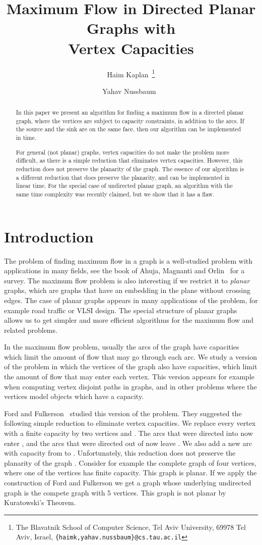 \documentclass[a4paper,11pt]{article}
\title{Maximum Flow in Directed Planar Graphs with\\Vertex Capacities}
\author{Haim Kaplan~\thanks{The Blavatnik School of Computer Science, 
Tel Aviv University, 69978 Tel Aviv, Israel, 
{\small \texttt{\{haimk,yahav.nussbaum\}@cs.tau.ac.il}}}\and Yahav Nussbaum~}
\date{}
\begin{document}
\maketitle

\begin{abstract}
    In this paper we present an   algorithm for  finding
    a maximum flow in a directed planar graph, where the vertices are subject to capacity constraints, in addition to the arcs.
    If the source and the sink are on the same face,
    then our algorithm can be implemented in   time.

    For general (not planar) graphs, vertex capacities do not make the problem more difficult,
    as there is a simple reduction that eliminates vertex capacities.
    However, this reduction does not preserve the planarity of the graph.
    The essence of our algorithm is a different reduction that does preserve the planarity,
      and can be implemented in linear time.
     For the special case of undirected planar graph,
      an algorithm with the same time complexity was recently claimed, but we show that it has a flaw.
\end{abstract}

\section{Introduction}

The problem of finding maximum flow in a graph  is a well-studied
problem with applications in many fields, see the book of Ahuja,
Magnanti and Orlin~\cite{AMO93} for a survey. The maximum flow
problem is also interesting if we restrict it to \emph{planar}
graphs, which are graphs that have an embedding in the plane without
crossing edges. The case of planar graphs appears in many
applications of the problem, for example road traffic or VLSI
design. The special structure of planar graphs allows us to get simpler
and more efficient algorithms for the maximum flow and related problems.

In the maximum flow problem, usually the arcs  of the graph have
capacities which limit the amount of flow that may go through each
arc. We study a version of the problem in which the vertices of the
graph also have capacities, which limit the amount of flow that may
enter each vertex. This version appears for example when
computing vertex disjoint paths in graphs, and  in other problems
where the vertices model objects which have a capacity.

Ford and Fulkerson~\cite[Chapter I.11]{FF62} studied this version of
the problem. They suggested the following simple reduction to
eliminate vertex capacities. We replace every vertex  with a
finite capacity  by two vertices  and . The arcs that were
directed into  now enter , and the arcs that were directed out of
 now leave . We also add a new arc with capacity  from
 to . Unfortunately, this reduction does not preserve the
planarity of the graph \cite{KN94}. Consider for example the
complete graph of four vertices, where one of the vertices has
finite capacity. This graph is planar. If we apply the construction
of Ford and Fulkerson we get a graph whose underlying undirected graph
is the compete graph with 5 vertices. This graph
is not planar by Kuratowski's Theorem.
\end{document}
